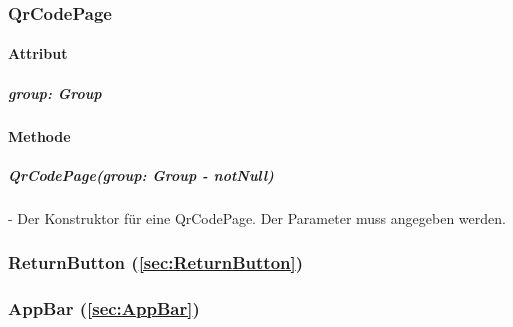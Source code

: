 \documentclass[parskip=full]{scrartcl}
\begin{document}
    \subsubsection{QrCodePage}
        \paragraph*{Attribut}
            \subparagraph*{group: Group}

        \paragraph*{Methode}
            \subparagraph*{QrCodePage(group: Group - notNull)} - Der Konstruktor für eine QrCodePage. Der Parameter muss angegeben werden.

    \subsubsection*{ReturnButton (\autoref{sec:ReturnButton})}

    \subsubsection*{AppBar (\autoref{sec:AppBar})}
    
\end{document}
